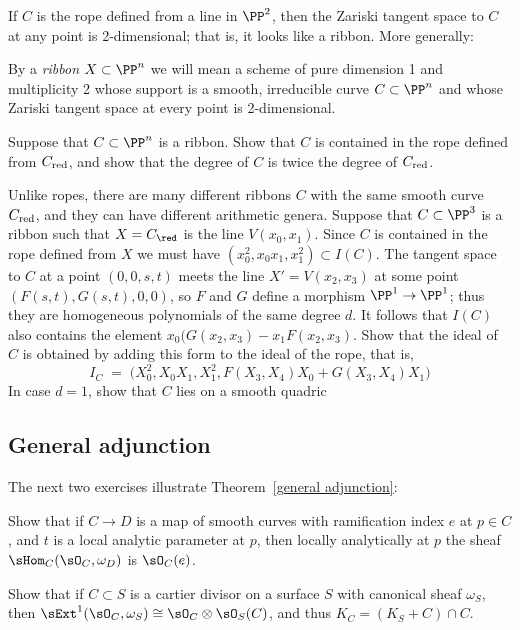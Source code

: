 If $C$ is the rope defined from a line in $\PP^2$, then the Zariski tangent space to $C$ at
any point is 2-dimensional; that is, it looks like a ribbon. More generally:

\begin{definition}
By a \emph{ribbon} $X \subset \PP^n$ we will mean a scheme of pure dimension 1 and multiplicity 2 whose support is a smooth, irreducible curve $C \subset \PP^n$ and whose Zariski tangent space at every point is 2-dimensional.
\end{definition}

\begin{exercise}
Suppose that $C\subset \PP^n$ is a ribbon. Show that $C$ is contained in the rope defined
from $C_{\rm red}$, and show that the degree of $C$ is twice the degree of $C_{\rm red}$.
\end{exercise}

Unlike ropes, there are many different ribbons $C$ with the same smooth curve $C_{\rm red}$,
and they can have different arithmetic genera. 
Suppose that $C\subset \PP^3$ is a ribbon such that $X = C_{\red}$ is the line $V(x_0,x_1)$.
Since $C$ is contained in the rope defined from $X$ we must have $(x_0^2, x_0x_1,x_1^2) \subset I(C)$. The tangent space to $C$ at a point $(0,0,s,t)$ meets the line  $X' = V(x_2, x_3)$
at some point $(F(s,t),G(s,t),0,0)$, so $F$ and $G$ define a morphism $\PP^1 \to \PP^1$;
thus they are homogeneous polynomials of the same degree $d$.  It follows that $I(C)$ also contains the element
$x_0(G(x_2, x_3) - x_1F(x_2,x_3)$. Show that the ideal of $C$ is obtained by adding this form to the ideal of the rope, that is,
$$
I_C \; = \; \big(X_0^2, X_0X_1, X_1^2, F(X_3,X_4)X_0 + G(X_3,X_4)X_1\big)
$$
In case $d=1$, show that $C$ lies on a smooth quadric 
\subsection{General adjunction}

The next two exercises illustrate Theorem~\ref{general adjunction}:

\begin{exercise}\label{codimension0}
Show that if $C\to D$ is a map of smooth curves with ramification index $e$ at $p\in C$, and $t$ is a local
analytic parameter at $p$, then 
locally analytically at $p$ the sheaf $\sHom_C(\sO_C, \omega_D)$ is $\sO_C(e)$.
\end{exercise}

\begin{exercise}\label{codimension1}
 Show that if $C\subset S$ is a cartier divisor on a surface $S$ with canonical sheaf $\omega_S$, 
 then $\sExt^1(\sO_C, \omega_S) \cong \sO_C\otimes \sO_S(C)$, and thus $K_C = (K_S+C)\cap C$.
\end{exercise}



